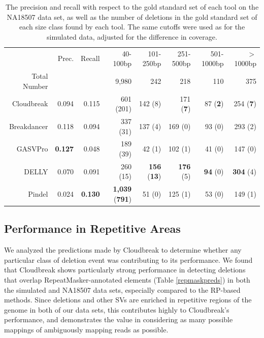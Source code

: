 \documentclass[11pt]{article}
\begin{document}
\begin{table}[t]
\begin{center}
\begin{tabular}{rrr|rrrrr}
  \hline
 & Prec. & Recall & 40-100bp & 101-250bp & 251-500bp & 501-1000bp & $>$ 1000bp \\ 
Total Number & & & 9,980 & 242 & 218 & 110 & 375 \\
  \hline
Cloudbreak & 0.094 & 0.115 & 601 (201) & 142 (8) & 171 (\textbf{7}) &  87 (\textbf{2}) & 254 (\textbf{7}) \\ 
Breakdancer & 0.118 & 0.094 & 337 (31) & 137 (4) & 169 (0) & 93 (0) & 293 (2) \\
  GASVPro & \textbf{0.127} & 0.048 & 189 (39) &  42 (1) & 102 (1) &  41 (0) & 147 (0) \\ 
  DELLY & 0.070 & 0.091 & 260 (15) & \textbf{156} (\textbf{13}) & \textbf{176} (5) &  \textbf{94} (0) & \textbf{304} (4) \\ 
  Pindel & 0.024 & \textbf{0.130} & \textbf{1,039} (\textbf{791}) & 51 (0) & 125 (1) &  53 (0) & 149 (1) \\ 
   \hline
\end{tabular}
\end{center}
\caption{The precision and recall with respect to the gold standard set of each tool on the NA18507 data set, as well as the number of deletions in the gold standard set of each size class found by each tool. The same cutoffs were used as for the simulated data, adjusted for the difference in coverage.}
\label{NA18507preds}
\end{table}

\subsection{Performance in Repetitive Areas}

We analyzed the predictions made by Cloudbreak to determine whether any particular class of deletion event was contributing to its performance. We found that Cloudbreak shows particularly strong performance in detecting deletions that overlap RepeatMasker-annotated elements (Table \ref{repmaskpreds}) in both the simulated and NA18507 data sets, especially compared to the RP-based methods. Since deletions and other SVs are enriched in repetitive regions of the genome in both of our data sets, this contributes highly to Cloudbreak's performance, and demonstrates the value in considering as many possible mappings of ambiguously mapping reads as possible.
\end{document}
